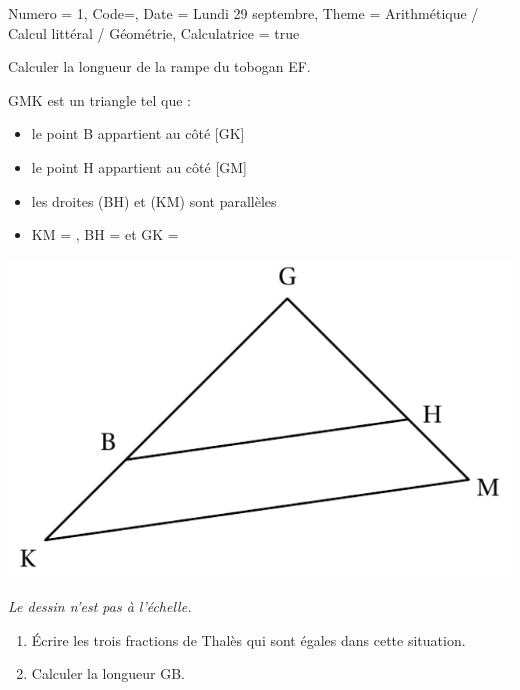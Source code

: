 \documentclass[11pt]{article}
\begin{document}
\begin{Maquette}[IE]{
        Numero = 1, Code={}, Date = Lundi 29 septembre, Theme = Arithmétique / Calcul littéral / Géométrie, Calculatrice = true
    }
\begin{exercice}
        Calculer la longueur de la rampe du tobogan EF.
    \end{exercice}
    \begin{exercice}
        \begin{multicols}{2}
             GMK est un triangle tel que :
            \begin{itemize}
                \item le point B appartient au côté [GK]
                \item le point H appartient au côté [GM]
                \item les droites (BH) et (KM) sont parallèles
                \item KM = , BH =  et GK = 
            \end{itemize}
            \columnbreak
            \begin{center}
                \includegraphics[width=.9\linewidth]{Images/Géométrie2.png}

                \emph{Le dessin n’est pas à l’échelle.}
            \end{center}
            
        \end{multicols}
            \begin{enumerate}
                \item Écrire les trois fractions de Thalès qui sont égales dans cette situation.
                \item Calculer la longueur GB.
        \end{enumerate}
    \end{exercice}
\end{Maquette}
\end{document}
